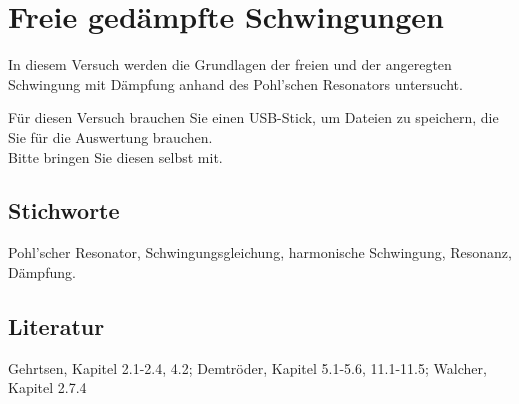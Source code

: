 \chapter{Freie gedämpfte Schwingungen}
\label{vn:1}


In diesem Versuch werden die Grundlagen der freien und der angeregten Schwingung mit Dämpfung anhand des Pohl'schen Resonators untersucht.
\begin{hint}
	Für diesen Versuch brauchen Sie einen USB-Stick, um Dateien zu speichern, die Sie für die Auswertung brauchen.\\
	Bitte bringen Sie diesen selbst mit.
\end{hint}


\section{Stichworte}
Pohl'scher Resonator, Schwingungsgleichung, harmonische Schwingung, Resonanz, Dämpfung.
%
\section{Literatur}
Gehrtsen, Kapitel 2.1-2.4, 4.2; Demtröder, Kapitel 5.1-5.6, 11.1-11.5; Walcher, Kapitel 2.7.4
%
